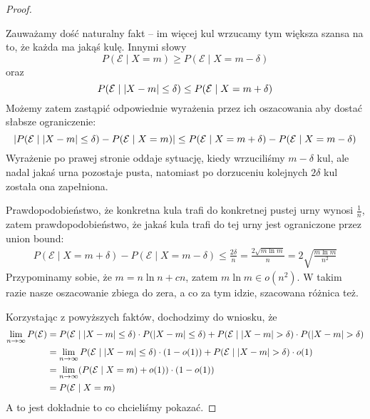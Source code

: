\begin{proof}
\begin{enumerate}
    Zauważamy dość naturalny fakt -- im więcej kul wrzucamy tym większa szansa na to, że każda ma jakąś kulę. Innymi słowy
    \[
        P(\mathcal{E} \mid X = m) \geq P(\mathcal{E} \mid X = m - \delta)
    \]
    oraz
    \[
        P(\mathcal{E} \mid \left\lvert X - m\right\rvert \leq \delta) \leq  P(\mathcal{E} \mid X = m + \delta)
    \]
    Możemy zatem zastąpić odpowiednie wyrażenia przez ich oszacowania aby dostać słabsze ograniczenie:
    \[ 
        \left\lvert P(\mathcal{E} \mid \left\lvert X - m\right\rvert \leq \delta) - P(\mathcal{E} \mid X = m)\right\rvert
        \leq P(\mathcal{E} \mid X = m + \delta) - P(\mathcal{E} \mid X = m - \delta) 
    \]
    Wyrażenie po prawej stronie oddaje sytuację, kiedy wrzuciliśmy \( m - \delta \) kul, ale nadal jakaś urna pozostaje pusta, natomiast po dorzuceniu kolejnych \( 2 \delta \) kul została ona zapełniona.
    
    Prawdopodobieństwo, że konkretna kula trafi do konkretnej pustej urny wynosi \( \frac{1}{n} \), 
    zatem prawdopodobieństwo, że jakaś kula trafi do tej urny jest ograniczone przez union bound:
    \begin{align*}
        P(\mathcal{E} \mid X = m + \delta) - P(\mathcal{E} \mid X = m - \delta) 
            \leq \frac{2\delta}{n}
           = \frac{2\sqrt{m \ln m}}{n} = 2\sqrt{\frac{m \ln m}{n^2}}
    \end{align*}
    Przypominamy sobie, że \( m = n \ln n + cn \), zatem \( m \ln m \in o(n^2) \).
    W takim razie nasze oszacowanie zbiega do zera, a co za tym idzie, szacowana różnica też.
\end{enumerate}
Korzystając z powyższych faktów, dochodzimy do wniosku, że
\begin{align*}
    \lim_{n \rightarrow \infty} P(\mathcal{E})
        &= P(\mathcal{E} \mid \abs{X - m} \leq \delta) \cdot P(\abs{X - m} \leq \delta)
            +
            P(\mathcal{E} \mid \abs{X - m} > \delta) \cdot P(\abs{X - m} > \delta) \\
        &= \lim_{n \rightarrow \infty} P(\mathcal{E} \mid \abs{X - m} \leq \delta) \cdot (1 - o(1))
            +
            P(\mathcal{E} \mid \abs{X - m} > \delta) \cdot o(1) \\
        &= \lim_{n \rightarrow \infty} \pars{P(\mathcal{E} \mid X = m) + o(1)} \cdot (1 - o(1))\\
        &= P(\mathcal{E} \mid X = m) \\
\end{align*}
A to jest dokładnie to co chcieliśmy pokazać.
\end{proof}
